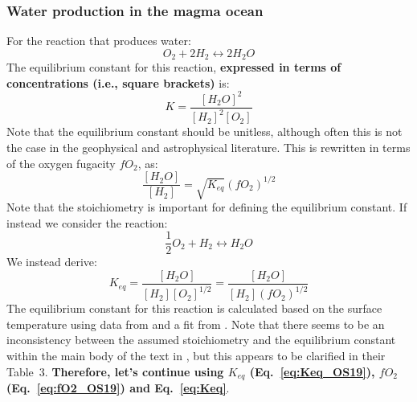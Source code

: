 \subsubsection{Water production in the magma ocean}
For the reaction that produces water:
\begin{equation}
    {O_2} + 2H_2 \leftrightarrow 2H_2O
    \label{eq:altreaction} 
\end{equation}
The equilibrium constant for this reaction, \textbf{expressed in terms of concentrations (i.e., square brackets)} is:
\begin{equation}
    K = \frac{[H_2O]^2}{[H_2]^2[O_2]}
\end{equation}
Note that the equilibrium constant should be unitless, although often this is not the case in the geophysical and astrophysical literature.
This is rewritten in terms of the oxygen fugacity $fO_2$, as: 
\begin{equation}
    \frac{[H_2O]}{[H_2]} = \sqrt{K_{eq}} \left(fO_2\right)^{1/2}
\end{equation}
Note that the stoichiometry is important for defining the equilibrium constant.  If instead we consider the reaction:
\begin{equation}
    \frac{1}{2} O_2 + H_2 \leftrightarrow H_2O
    \label{eq:reaction2}
\end{equation}
We instead derive:
\begin{equation}
     K_{eq} = \frac{[H_2O]}{[H_2] [O_2]^{1/2}} = \frac{[H_2O]}{[H_2] \left(fO_2\right)^{1/2}}
    \label{eq:Keq}
\end{equation}
The equilibrium constant for this reaction is calculated based on the surface temperature using data from \cite{RBF78} and a fit from \cite{OS19}.  Note that there seems to be an inconsistency between the assumed stoichiometry and the equilibrium constant within the main body of the text in \cite{OS19}, but this appears to be clarified in their Table~3.  \textbf{Therefore, let's continue using $K_{eq}$ (Eq.~\ref{eq:Keq_OS19}), $fO_2$ (Eq.~\ref{eq:fO2_OS19}) and Eq.~\ref{eq:Keq}}.
